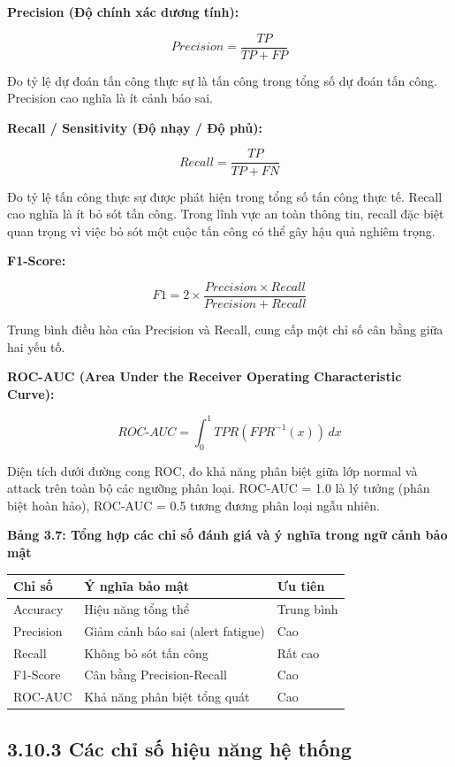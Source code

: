 \documentclass[
  a4paper]{report}
\newcounter{none} %
\begin{document}
\textbf{Precision (Độ chính xác dương tính):}

\[Precision = \frac{TP}{TP + FP}\]

Đo tỷ lệ dự đoán tấn công thực sự là tấn công trong tổng số dự đoán tấn
công. Precision cao nghĩa là ít cảnh báo sai.

\textbf{Recall / Sensitivity (Độ nhạy / Độ phủ):}

\[Recall = \frac{TP}{TP + FN}\]

Đo tỷ lệ tấn công thực sự được phát hiện trong tổng số tấn công thực tế.
Recall cao nghĩa là ít bỏ sót tấn công. Trong lĩnh vực an toàn thông
tin, recall đặc biệt quan trọng vì việc bỏ sót một cuộc tấn công có thể
gây hậu quả nghiêm trọng.

\textbf{F1-Score:}

\[F1 = 2 \times \frac{Precision \times Recall}{Precision + Recall}\]

Trung bình điều hòa của Precision và Recall, cung cấp một chỉ số cân
bằng giữa hai yếu tố.

\textbf{ROC-AUC (Area Under the Receiver Operating Characteristic
Curve):}

\[ROC\text{-}AUC = \int_0^1 TPR(FPR^{-1}(x)) \, dx\]

Diện tích dưới đường cong ROC, đo khả năng phân biệt giữa lớp normal và
attack trên toàn bộ các ngưỡng phân loại. ROC-AUC = 1.0 là lý tưởng
(phân biệt hoàn hảo), ROC-AUC = 0.5 tương đương phân loại ngẫu nhiên.

\textbf{Bảng 3.7: Tổng hợp các chỉ số đánh giá và ý nghĩa trong ngữ cảnh
bảo mật}

{\def\LTcaptype{none} %
\begin{longtable}[]{@{}lll@{}}
\toprule\noalign{}
Chỉ số & Ý nghĩa bảo mật & Ưu tiên \\
\midrule\noalign{}
\endhead
\bottomrule\noalign{}
\endlastfoot
Accuracy & Hiệu năng tổng thể & Trung bình \\
Precision & Giảm cảnh báo sai (alert fatigue) & Cao \\
Recall & Không bỏ sót tấn công & Rất cao \\
F1-Score & Cân bằng Precision-Recall & Cao \\
ROC-AUC & Khả năng phân biệt tổng quát & Cao \\
\end{longtable}
}

\subsection{3.10.3 Các chỉ số hiệu năng hệ
thống}\label{cuxe1c-chux1ec9-sux1ed1-hiux1ec7u-nux103ng-hux1ec7-thux1ed1ng}
\end{document}
